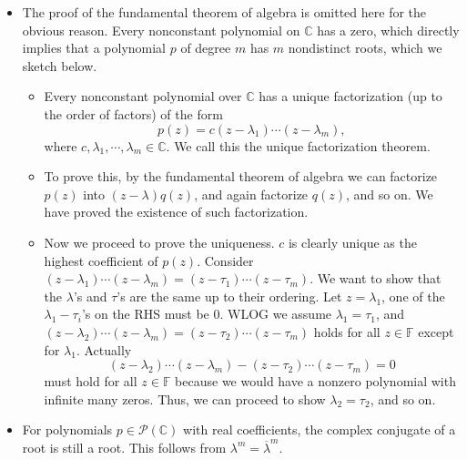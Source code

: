 \documentclass{article}
\newcommand{\C}{\mathbb{C}}
\newcommand{\F}{\mathbb{F}}
\newcommand{\conj}[1]{\overline{#1}}
\begin{document}
\begin{itemize}
    \item The proof of the fundamental theorem of algebra is omitted here for the obvious reason. Every nonconstant polynomial on $\C$ has a zero, which directly implies that a polynomial $p$ of degree $m$ has $m$ nondistinct roots, which we sketch below.
    \begin{itemize}
        \item Every nonconstant polynomial over $\C$ has a unique factorization (up to the order of factors) of the form 
        \begin{equation}
            p(z) = c(z - \lambda_1)\cdots(z-\lambda_m), \tag{$\star$}
        \end{equation}
        where $c, \lambda_1,\cdots,\lambda_m \in \C$. We call this the unique factorization theorem.
    \end{itemize}
    \begin{itemize}
        \item To prove this, by the fundamental theorem of algebra we can factorize $p(z)$ into $(z-\lambda)q(z)$, and again factorize $q(z)$, and so on. We have proved the existence of such factorization.
        \item Now we proceed to prove the uniqueness. $c$ is clearly unique as the highest coefficient of $p(z)$. Consider $(z - \lambda_1)\cdots(z-\lambda_m)=(z - \tau_1)\cdots(z-\tau_m)$. We want to show that the $\lambda$'s and $\tau$'s are the same up to their ordering. Let $z = \lambda_1$, one of the $\lambda_1 - \tau_i$'s on the RHS must be 0. WLOG we assume $\lambda_1 = \tau_1$, and $(z - \lambda_2)\cdots(z-\lambda_m)=(z - \tau_2)\cdots(z-\tau_m)$ holds for all $z \in \F$ except for $\lambda_1$. Actually $$(z - \lambda_2)\cdots(z-\lambda_m) - (z - \tau_2)\cdots(z-\tau_m) = 0$$ must hold for all $z \in \F$ because we would have a nonzero polynomial with infinite many zeros. Thus, we can proceed to show $\lambda_2 = \tau_2$, and so on.
    \end{itemize}
    \item For polynomials $p \in \mathcal{P}(\C)$ with real coefficients, the complex conjugate of a root is still a root. This follows from $\lambda^m = \conj{\lambda}^m$.
    

\end{itemize}
\end{document}
